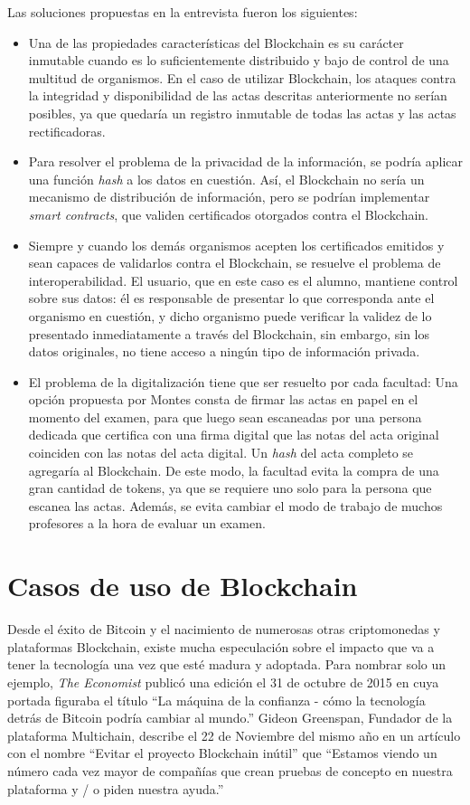Las soluciones propuestas en la entrevista fueron los siguientes: 
\begin{itemize}
\item Una de las propiedades características del Blockchain es su carácter inmutable cuando es lo suficientemente distribuido y bajo de control de una multitud de organismos. En el caso de utilizar Blockchain, los ataques contra la integridad y disponibilidad de las actas descritas anteriormente no serían posibles, ya que quedaría un registro inmutable de todas las actas y las actas rectificadoras.
\item Para resolver el problema de la privacidad de la información, se podría aplicar una función \textit{hash} a los datos en cuestión. Así, el Blockchain no sería un mecanismo de distribución de información, pero se podrían implementar \textit{smart contracts}, que validen certificados otorgados contra el Blockchain.
\item Siempre y cuando los demás organismos acepten los certificados emitidos y sean capaces de validarlos contra el Blockchain, se resuelve el problema de interoperabilidad. El usuario, que en este caso es el alumno, mantiene control sobre sus datos: él es responsable de presentar lo que corresponda ante el organismo en cuestión, y dicho organismo puede verificar la validez de lo presentado inmediatamente a través del Blockchain, sin embargo, sin los datos originales, no tiene acceso a ningún tipo de información privada.
\item El problema de la digitalización tiene que ser resuelto por cada facultad: Una opción propuesta por Montes consta de firmar las actas en papel en el momento del examen, para que luego sean escaneadas por una persona dedicada que certifica con una firma digital que las notas del acta original coinciden con las notas del acta digital. Un \textit{hash} del acta completo se agregaría al Blockchain. De este modo, la facultad evita la compra de una gran cantidad de tokens, ya que se requiere uno solo para la persona que escanea las actas. Además, se evita cambiar el modo de trabajo de muchos profesores a la hora de evaluar un examen.
\end{itemize}

\section{Casos de uso de Blockchain}
Desde el éxito de Bitcoin y el nacimiento de numerosas otras criptomonedas y plataformas Blockchain, existe mucha especulación sobre el impacto que va a tener la tecnología una vez que esté madura y adoptada. Para nombrar solo un ejemplo, \textit{The Economist} publicó una edición el 31 de octubre de 2015 en cuya portada figuraba el título ``La máquina de la confianza - cómo la tecnología detrás de Bitcoin podría cambiar al mundo.'' Gideon Greenspan, Fundador de la plataforma Multichain, describe el 22 de Noviembre del mismo año en un artículo con el nombre ``Evitar el proyecto Blockchain inútil'' que ``Estamos viendo un número cada vez mayor de compañías que crean pruebas de concepto en nuestra plataforma y / o piden nuestra ayuda.''

